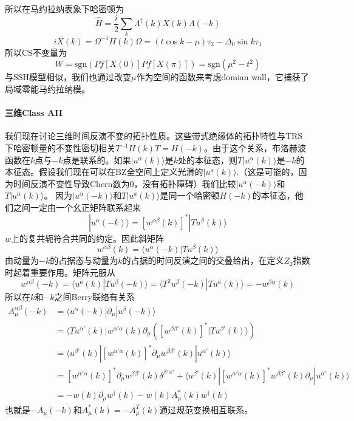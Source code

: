 \documentclass{article}
\numberwithin{equation}{subsection}
\begin{document}
所以在马约拉纳表象下哈密顿为
\begin{equation}
    \hat{H}=\frac{i}{2}\sum_{k}\Lambda^\dagger(k)X(k)\Lambda(-k)
\end{equation}
\begin{equation}
    iX(k)=\Omega^{-1}H(k)\Omega=(t\cos k-\mu)\tau_2-\Delta_0\sin k\tau_1
\end{equation}
所以CS不变量为
\begin{equation}
    W=\mathrm{sgn}(Pf[X(0)]Pf[X(\pi)])=\mathrm{sgn}(\mu^2-t^2)
\end{equation}
与SSH模型相似，我们也通过改变$\mu$作为空间的函数来考虑domian wall，它捕获了局域零能马约拉纳模。
\paragraph{三维Class AII}
我们现在讨论三维时间反演不变的拓扑性质。这些带式绝缘体的拓扑特性与TRS下哈密顿量的不变性密切相关$T^{-1}H(k)T=H(-k)$。由于这个关系，布洛赫波函数在$k$点与$-k$点是联系的。如果$|u^\alpha(k)\rangle$是$k$处的本征态，则$T|u^\alpha(k)\rangle$是$-k$的本征态。假设我们现在可以在BZ全空间上定义光滑的$|u^a(k)\rangle$.（这是可能的，因为时间反演不变性导致Chern数为$0$，没有拓扑障碍）我们比较$|u^\alpha(-k)\rangle$和$T|u^\alpha(k)\rangle$。 因为$|u^\alpha(-k)\rangle$和$T|u^a(k)\rangle$是同一个哈密顿$H(-k)$的本征态，他们之间一定由一个幺正矩阵联系起来
\begin{equation}
    |u^\alpha(-k)\rangle=[w^{\alpha\beta}(k)]^*|Tu^\beta(k)\rangle
\end{equation} 
$w$上的复共轭符合共同的约定。因此斜矩阵
\begin{equation}
    w^{\alpha\beta}(k)=\langle u^\alpha(-k)|Tu^\beta(k)\rangle
\end{equation}
由动量为$-k$的占据态与动量为$k$的占据的时间反演之间的交叠给出，在定义$Z_2$指数时起着重要作用。矩阵元服从
\begin{equation}
    w^{\alpha\beta}(-k)=\langle u^a(k)|T u^\beta(-k)\rangle=\langle T^2 u^\beta(-k)|Tu^a(k)\rangle=-w^{\beta\alpha}(k)
\end{equation}
所以在$k$和$-k$之间Berry联络有关系
\begin{equation}
    \begin{split}
        A_\mu^{\alpha\beta}(-k)&=\langle u^\alpha(-k)|\partial_\mu|u^\beta(-k)\rangle\\
        &=\langle T u^{\alpha'}(k)|w^{\alpha'\alpha}(k)\partial_\mu\left([w^{\beta\beta'}(k)]^*|Tu^{\beta'}(k)\rangle\right)\\
        &=\langle u^{\beta'}(k)|[w^{\alpha'\alpha}(k)]^*\partial_\mu w^{\beta\beta'}(k)|u^{\alpha'}(k)\rangle\\
        &=[w^{\alpha'\alpha}(k)]^*\partial_\mu w^{\beta\beta'}(k)\delta^{\beta'\alpha'}+\langle u^{\beta'}(k)|[w^{\alpha'\alpha}(k)]^*w^{\beta\beta'}(k)\partial_\mu|u^{\alpha'}(k)\rangle\\
        &=-w(k)\partial_\mu w^\dagger(k)-w(k)A_\mu^*(k)w^\dagger(k)
    \end{split}
\end{equation}
也就是$-A_\mu(-k)$和$A^*_\mu(k)=-A^T_\mu(k)$通过规范变换相互联系。
\end{document}
